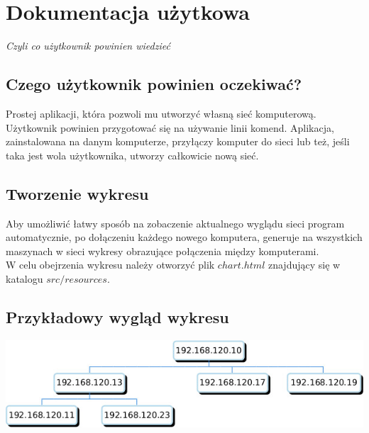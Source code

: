 \section{Dokumentacja użytkowa}

\begin{center}
\textit{Czyli co użytkownik powinien wiedzieć}
\end{center}



\subsection{Czego użytkownik powinien oczekiwać?}
Prostej aplikacji, która pozwoli mu utworzyć własną sieć komputerową. Użytkownik powinien przygotować się na używanie linii komend. Aplikacja, zainstalowana na danym komputerze, przyłączy komputer do sieci lub też, jeśli taka jest wola użytkownika, utworzy całkowicie nową sieć.

\subsection{Tworzenie wykresu}
Aby umożliwić łatwy sposób na zobaczenie aktualnego wyglądu sieci program automatycznie, po dołączeniu każdego nowego komputera, generuje na wszystkich maszynach w sieci wykresy obrazujące połączenia między komputerami.\\
\indent W celu obejrzenia wykresu należy otworzyć plik $chart.html$ znajdujący się w katalogu $src/resources$.

\subsection{Przykładowy wygląd wykresu}

\includegraphics[width=1.0\textwidth]{chart.jpg}

